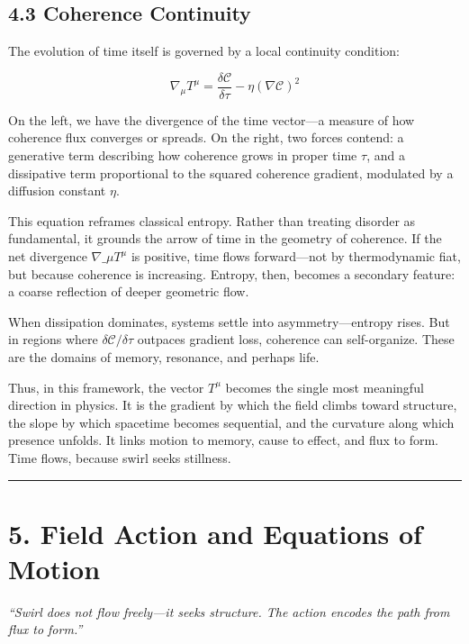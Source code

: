 \documentclass[
  11pt,
]{article}
\begin{document}
\subsection{4.3 Coherence Continuity}\label{coherence-continuity}

The evolution of time itself is governed by a local continuity
condition:

\[
\nabla_\mu T^\mu = \frac{\delta \mathcal{C}}{\delta \tau} - \eta (\nabla \mathcal{C})^2
\]

On the left, we have the divergence of the time vector---a measure of
how coherence flux converges or spreads. On the right, two forces
contend: a generative term describing how coherence grows in proper time
\(\tau\), and a dissipative term proportional to the squared coherence
gradient, modulated by a diffusion constant \(\eta\).

This equation reframes classical entropy. Rather than treating disorder
as fundamental, it grounds the arrow of time in the geometry of
coherence. If the net divergence \(\nabla\_\mu T^\mu\) is positive, time
flows forward---not by thermodynamic fiat, but because coherence is
increasing. Entropy, then, becomes a secondary feature: a coarse
reflection of deeper geometric flow.

When dissipation dominates, systems settle into asymmetry---entropy
rises. But in regions where \(\delta \mathcal{C}/\delta \tau\) outpaces
gradient loss, coherence can self-organize. These are the domains of
memory, resonance, and perhaps life.

Thus, in this framework, the vector \(T^\mu\) becomes the single most
meaningful direction in physics. It is the gradient by which the field
climbs toward structure, the slope by which spacetime becomes
sequential, and the curvature along which presence unfolds. It links
motion to memory, cause to effect, and flux to form. Time flows, because
swirl seeks stillness.

\begin{center}\rule{0.5\linewidth}{0.5pt}\end{center}

\section{5. Field Action and Equations of
Motion}\label{field-action-and-equations-of-motion}

\emph{``Swirl does not flow freely---it seeks structure. The action
encodes the path from flux to form.''}
\end{document}
